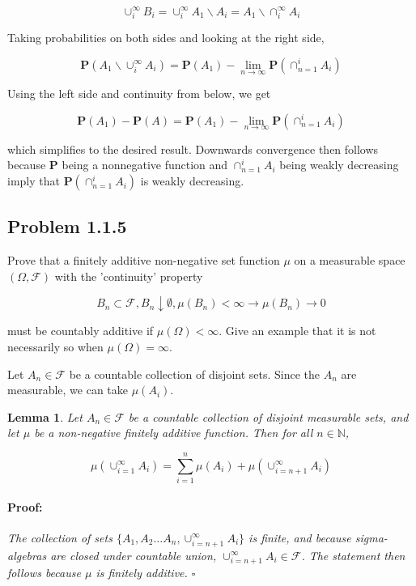 \documentclass{article}
\newenvironment{proof}{\paragraph{Proof:}}{\hfill$\square$}
\newtheorem{lemma}[theorem]{Lemma}
\newcommand{\F}{\mathcal{F}}
\newcommand{\prob}{\boldsymbol{P}}
\newcommand{\N}{\mathbb{N}}
\begin{document}
\[
\cup_i^\infty B_i = \cup_i^\infty A_1 \backslash A_i = A_1 \backslash \cap_i^\infty A_i
\]

Taking probabilities on both sides and looking at the right side,

\[
\prob(A_1 \backslash \cup_i^\infty A_i) = \prob(A_1) - \lim_{n \rightarrow \infty} \prob(\cap_{n=1}^i A_i)
\]

Using the left side and continuity from below, we get

\[
\prob(A_1) - \prob(A) = \prob(A_1) - \lim_{n \rightarrow \infty} \prob(\cap_{n=1}^i A_i)
\]

which simplifies to the desired result. Downwards convergence then follows because $\prob$ being a nonnegative function and $\cap_{n=1}^i A_i$ being weakly decreasing imply that $\prob(\cap_{n=1}^i A_i)$ is weakly decreasing.

\subsection*{Problem 1.1.5}

Prove that a finitely additive non-negative set function $\mu$ on a measurable space $(\Omega, \F)$ with the 'continuity' property

\[
B_n \subset \F, B_n \downarrow \emptyset, \mu(B_n) < \infty \longrightarrow \mu(B_n) \rightarrow 0
\]

must be countably additive if $\mu(\Omega) < \infty$. Give an example that it is not necessarily so when $\mu(\Omega) = \infty$.

Let $A_n \in \F$ be a countable collection of disjoint sets. Since the $A_n$ are measurable, we can take $\mu(A_i)$.

\begin{lemma}
Let $A_n \in \F$ be a countable collection of disjoint measurable sets, and let $\mu$ be a non-negative finitely additive function. Then for all $n \in \N$,

\[
\mu(\cup_{i=1}^\infty A_i) = \sum_{i=1}^n \mu(A_i) + \mu(\cup_{i=n+1}^\infty A_i)
\]
\begin{proof}
The collection of sets $\{A_1, A_2 \dots A_n, \cup_{i=n+1}^\infty A_i\}$ is finite, and because sigma-algebras are closed under countable union, $\cup_{i=n+1}^\infty A_i \in \F$. The statement then follows because $\mu$ is finitely additive.
\end{proof}
\end{lemma}
\end{document}
